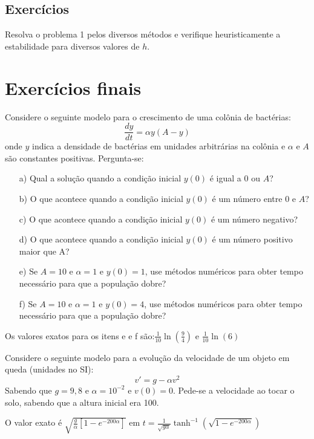 \subsection*{Exercícios}

\begin{exer} Resolva o problema 1 pelos diversos métodos e verifique heuristicamente a estabilidade para diversos valores de $h$.
\end{exer}

\section{Exercícios finais}

\begin{exer} Considere o seguinte modelo para o crescimento de uma colônia de bactérias:
$$\frac{dy}{dt}=\alpha y (A-y)$$
onde $y$ indica a densidade de bactérias em unidades arbitrárias na colônia e $\alpha$ e $A$ são constantes positivas.
Pergunta-se:
\begin{itemize}
\item[a)] Qual a solução quando a condição inicial $y(0)$ é igual a $0$ ou $A$?
\item[b)] O que acontece quando a condição inicial $y(0)$ é um número entre $0$ e $A$?
\item[c)] O que acontece quando a condição inicial $y(0)$ é um número negativo?
\item[d)] O que acontece quando a condição inicial $y(0)$ é um número positivo maior que A?
\item[e)] Se $A=10$ e $\alpha=1$ e $y(0)=1$, use métodos numéricos para obter tempo necessário para que a população dobre?
\item[f)] Se $A=10$ e $\alpha=1$ e $y(0)=4$, use métodos numéricos para obter tempo necessário para que a população dobre?
\end{itemize}
\end{exer}
\begin{resp}
  
Os valores exatos para os itens e e f são:$\frac{1}{10}\ln\left(\frac{9}{4}\right)$ e $\frac{1}{10}\ln\left(6\right)$    
  
\end{resp}

\begin{exer} Considere o seguinte modelo para a evolução da velocidade de um objeto em queda (unidades no SI):
$$v'=g-\alpha v^2$$
Sabendo que $g=9,8$ e $\alpha=10^{-2}$ e $v(0)=0$. Pede-se a velocidade ao tocar o solo, sabendo que a altura inicial era 100.

\end{exer}
\begin{resp}
  
O valor exato é $\sqrt{\frac{g}{\alpha}\left[1-e^{{-200\alpha}}\right]}$ em $t=\frac{1}{\sqrt{g\alpha}}\tanh^{-1}\left(\sqrt{1-e^{{-200\alpha}}}\right)$    
  
\end{resp}


